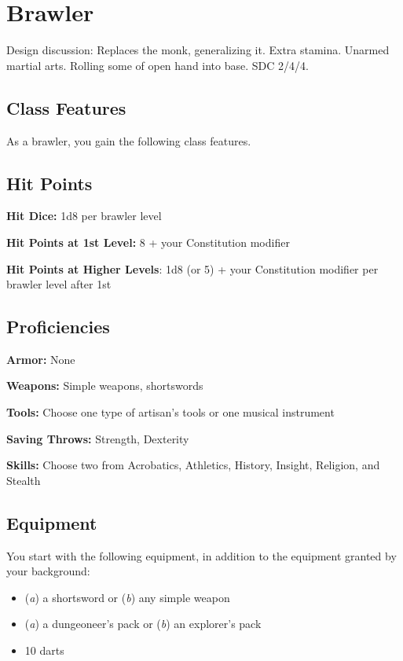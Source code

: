 \section{Brawler}

Design discussion: Replaces the monk, generalizing it. Extra stamina. Unarmed martial arts. Rolling some of open hand into base. SDC 2/4/4.

\subsection{Class Features}

As a brawler, you gain the following class features.

\subsection{Hit Points}

\textbf{Hit Dice:} 1d8 per brawler level

\textbf{Hit Points at 1st Level:} 8 + your Constitution modifier

\textbf{Hit Points at Higher Levels}: 1d8 (or 5) + your Constitution modifier per brawler level after 1st

\subsection{Proficiencies}

\textbf{Armor:} None

\textbf{Weapons:} Simple weapons, shortswords

\textbf{Tools:} Choose one type of artisan's tools or one musical instrument

\textbf{Saving Throws:} Strength, Dexterity

\textbf{Skills:} Choose two from Acrobatics, Athletics, History, Insight, Religion, and Stealth

\subsection{Equipment}

You start with the following equipment, in addition to the equipment granted by your background:
\begin{itemize}
\item (\textit{a}) a shortsword or (\textit{b}) any simple weapon
\item (\textit{a}) a dungeoneer's pack or (\textit{b}) an explorer's pack
\item 10 darts
\end{itemize}

